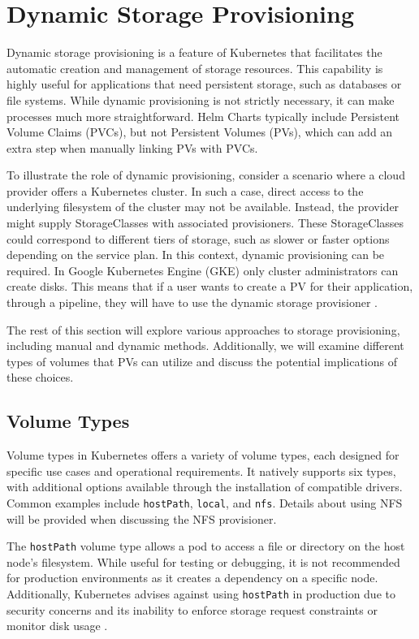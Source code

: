 \section{Dynamic Storage Provisioning}
Dynamic storage provisioning is a feature of Kubernetes that facilitates the automatic creation and management of storage resources. This capability is highly useful for applications that need persistent storage, such as databases or file systems. While dynamic provisioning is not strictly necessary, it can make processes much more straightforward. Helm Charts typically include Persistent Volume Claims (PVCs), but not Persistent Volumes (PVs), which can add an extra step when manually linking PVs with PVCs.

To illustrate the role of dynamic provisioning, consider a scenario where a cloud provider offers a Kubernetes cluster. In such a case, direct access to the underlying filesystem of the cluster may not be available. Instead, the provider might supply StorageClasses with associated provisioners. These StorageClasses could correspond to different tiers of storage, such as slower or faster options depending on the service plan. In this context, dynamic provisioning can be required. In Google Kubernetes Engine (GKE) only cluster administrators can create disks. This means that if a user wants to create a PV for their application, through a pipeline, they will have to use the dynamic storage provisioner \Parencite{googlek8spv}. 

The rest of this section will explore various approaches to storage provisioning, including manual and dynamic methods. Additionally, we will examine different types of volumes that PVs can utilize and discuss the potential implications of these choices.

\subsection{Volume Types} 
Volume types in Kubernetes offers a variety of volume types, each designed for specific use cases and operational requirements. It natively supports six types, with additional options available through the installation of compatible drivers. Common examples include \texttt{hostPath}, \texttt{local}, and \texttt{nfs}. Details about using NFS will be provided when discussing the NFS provisioner.

The \texttt{hostPath} volume type allows a pod to access a file or directory on the host node's filesystem. While useful for testing or debugging, it is not recommended for production environments as it creates a dependency on a specific node. Additionally, Kubernetes advises against using \texttt{hostPath} in production due to security concerns and its inability to enforce storage request constraints or monitor disk usage \Parencite{kubernetes_hostpath}.

